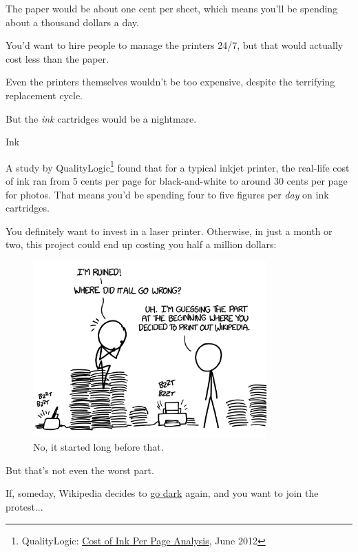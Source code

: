 {{The paper would be about one cent per sheet, which means you'll be spending about a thousand dollars a day.}

{You'd want to hire people to manage the printers 24/7, but that would actually cost less than the paper.}

{Even the printers themselves wouldn't be too expensive, despite the terrifying replacement cycle.}

{But the \emph{ink} cartridges would be a nightmare.}

{Ink}

{A study by QualityLogic{\footnote{QualityLogic: \href{http://www.qualitylogic.com/tuneup/uploads/docfiles/QualityLogic-Cost-of-Ink-Per-Page-Analysis\_US\_1-Jun-2012.pdf}{Cost of Ink Per Page Analysis}, June 2012} } found that for a typical inkjet printer, the real-life cost of ink ran from 5 cents per page for black-and-white to around 30 cents per page for photos. That means you'd be spending four to five figures per \emph{day} on ink cartridges.}

{You definitely want to invest in a laser printer. Otherwise, in just a month or two, this project could end up costing you half a million dollars:}

\begin{figure}[!htbp]
\centering
\includegraphics[scale=0.5, max width=0.8\textwidth]{imgs/a/59/wiki_wrong.png}
\caption{No, it started long before that.}
\end{figure}

{But that's not even the worst part.}

{If, someday, Wikipedia decides to \href{http://sys01-public.msnbc.msn.com/technology/wikipedia-goes-dark-piracy-bill-protest-day-117714}{go dark} again, and you want to join the protest...}

}
